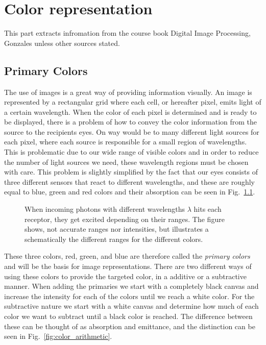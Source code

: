\chapter{Color representation}

This part extracts infromation from the course book Digital Image Processing, Gonzales \cite{diProcessing} unless other sources stated.

\section{Primary Colors}

The use of images is a great way of providing information visually. An image is represented by a rectangular grid where each cell, or hereafter pixel, emits light of a certain wavelength. When the color of each pixel is determined and is ready to be displayed, there is a problem of how to convey the color information from the source to the recipients eyes. On way would be to many different light sources for each pixel, where each source is responsible for a small region of wavelengths. This is problematic due to our wide range of visible colors and in order to reduce the number of light sources we need, these wavelength regions must be chosen with care. This problem is slightly simplified by the fact that our eyes consists of three different sensors that react to different wavelengths, and these are roughly equal to blue, green and red colors and their absorption can be seen in Fig.~\ref{fig:colorAbsorption}.

\begin{figure}[h]
    \centering
    \resizebox{0.49\textwidth}{!}{
        
    }
    \caption{\label{fig:colorAbsorption}When incoming photons with different wavelengths $\lambda$ hits each receptor, they get excited depending on their ranges. The figure shows, not accurate ranges nor intensities, but illustrates a schematically the different ranges for the different colors. }
\end{figure}

These three colors, red, green, and blue are therefore called the \textit{primary colors} and will be the basis for image representations. There are two different ways of using these colors to provide the targeted color, in a additive or a subtractive manner. When adding the primaries we start with a completely black canvas and increase the intensity for each of the colors until we reach a white color. For the subtractive nature we start with a white canvas and determine how much of each color we want to subtract until a black color is reached. The difference between these can be thought of as absorption and emittance, and the distinction can be seen in Fig.~\ref{fig:color_arithmetic}.

